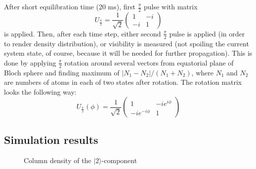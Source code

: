 \documentclass[12pt,notitlepage]{report}
\begin{document}
After short equilibration time (20 ms), first $\frac{\pi}{2}$ pulse with matrix
$$
U_{\frac{\pi}{2}} = \frac{1}{\sqrt{2}} \left( \begin{array}{cc} 
1 & -i \\
-i & 1 
\end{array} \right)
$$
is applied. Then, after each time step, either second $\frac{\pi}{2}$ pulse is applied (in order to render density distribution), or visibility is measured (not spoiling the current system state, of course, because it will be needed for further propagation). This is done by applying $\frac{\pi}{2}$ rotation around several vectors from equatorial plane of Bloch sphere and finding maximum of $\vert N_1 - N_2 \vert / (N_1 + N_2)$, where $N_1$ and $N_2$ are numbers of atoms in each of two states after rotation. The rotation matrix looks the following way:
$$
U_{\frac{\pi}{2}}(\phi) = \frac{1}{\sqrt{2}} \left( \begin{array}{cc} 
1 & -i e^{i \phi} \\
-i e^{-i \phi} & 1 
\end{array} \right)
$$

\subsection*{Simulation results}

\begin{figure}
\begin{center}
\qquad
{}
\end{center}
\caption{Column density of the $\mid2\rangle$-component}
\label{evolution}
\end{figure}
\end{document}
